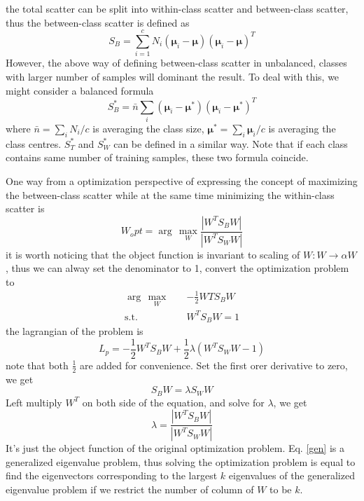 \documentclass[conference]{IEEEtran}
\begin{document}
the total scatter can be split into within-class scatter and between-class scatter, thus the between-class scatter is defined as
\begin{equation}
	S_B=\sum_{i=1}^{c}N_i(\bm{\mu}_i-\bm{\mu})(\bm{\mu}_i-\bm{\mu})^T
\end{equation}
However, the above way of defining between-class scatter in unbalanced, classes with larger number of samples will dominant the result. To deal with this, we might consider a balanced formula
\begin{equation}
	S_B^*=\bar{n}\sum_{i}(\bm{\mu}_i-\bm{\mu}^*)(\bm{\mu}_i-\bm{\mu}^*)^T
\end{equation}
where $\bar{n}=\sum_{i}N_i/c$ is averaging the class size, $\bm{\mu}^*=\sum_i\bm{\mu}_i/c$ is averaging the class centres. $S_T^*$ and $S_W^*$ can be defined in a similar way. Note that if each class contains same number of training samples, these two formula coincide.

One way from a optimization perspective of expressing the concept of maximizing the between-class scatter while at the same time minimizing the within-class scatter is
\begin{equation}
	W_opt=\arg\,\max_{W}\frac{|W^TS_BW|}{|W^TS_WW|}
\end{equation}
it is worth noticing that the object function is invariant to scaling of $W: W\rightarrow \alpha W$, thus we can alway set the denominator to 1, convert the optimization problem to
\begin{equation}
	\begin{split}
		\arg\,\max_{W}\quad&-\frac{1}{2}WTS_BW \\  \mathrm{s.t.}  \quad &W^TS_BW=1
	\end{split}
\end{equation}
the lagrangian of the problem is
\begin{equation}
	L_p=-\frac{1}{2}W^TS_BW+\frac{1}{2}\lambda(W^TS_WW-1)
\end{equation}
note that both $\frac{1}{2}$ are added for convenience. Set the first orer derivative to zero, we get
\begin{equation}
	S_BW=\lambda S_WW
	\label{gen}
\end{equation}
Left multiply $W^T$ on both side of the equation, and solve for $\lambda$, we get
\begin{equation}
	\lambda=\frac{|W^TS_BW|}{|W^TS_WW|}
\end{equation}
It's just the object function of the original optimization problem. Eq. \ref{gen} is a generalized eigenvalue problem, thus solving the optimization problem is equal to find the eigenvectors corresponding to the largest $k$ eigenvalues of the generalized eigenvalue problem if we restrict the number of column of $W$ to be $k$.
\end{document}
